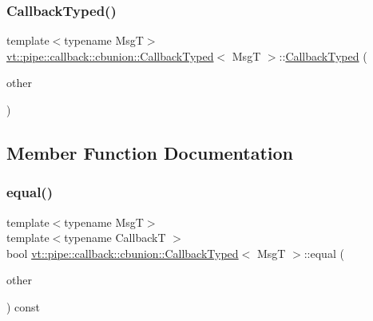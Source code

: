 \mbox{\label{structvt_1_1pipe_1_1callback_1_1cbunion_1_1_callback_typed_a51d3fdb7b8b73d077a76d79a52343794}} 
\subsubsection{\texorpdfstring{Callback\+Typed()}{CallbackTyped()}\hspace{0.1cm}{\footnotesize\ttfamily [14/14]}}
{\footnotesize\ttfamily template$<$typename MsgT$>$ \\
\hyperlink{structvt_1_1pipe_1_1callback_1_1cbunion_1_1_callback_typed}{vt\+::pipe\+::callback\+::cbunion\+::\+Callback\+Typed}$<$ MsgT $>$\+::\hyperlink{structvt_1_1pipe_1_1callback_1_1cbunion_1_1_callback_typed}{Callback\+Typed} (\begin{DoxyParamCaption}\item[{\hyperlink{structvt_1_1pipe_1_1callback_1_1cbunion_1_1_callback_raw_base_single}{Callback\+Raw\+Base\+Single} \&\&}]{other }\end{DoxyParamCaption})\hspace{0.3cm}{\ttfamily [inline]}}



\subsection{Member Function Documentation}
\mbox{\label{structvt_1_1pipe_1_1callback_1_1cbunion_1_1_callback_typed_a2c1b0eea2a4e14dc85a6ab889bd6a644}} 
\subsubsection{\texorpdfstring{equal()}{equal()}}
{\footnotesize\ttfamily template$<$typename MsgT$>$ \\
template$<$typename CallbackT $>$ \\
bool \hyperlink{structvt_1_1pipe_1_1callback_1_1cbunion_1_1_callback_typed}{vt\+::pipe\+::callback\+::cbunion\+::\+Callback\+Typed}$<$ MsgT $>$\+::equal (\begin{DoxyParamCaption}\item[{CallbackT const \&}]{other }\end{DoxyParamCaption}) const\hspace{0.3cm}{\ttfamily [inline]}}

